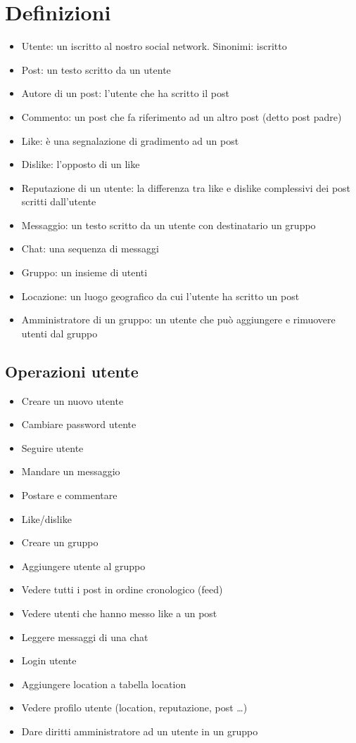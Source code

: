 \documentclass[a4paper,12pt]{report}
\begin{document}
\section{Definizioni}
\begin{itemize}
    \item Utente: un iscritto al nostro social network. Sinonimi: iscritto 
    \item Post: un testo scritto da un utente 
    \item Autore di un post: l'utente che ha scritto il post
    \item Commento: un post che fa riferimento ad un altro post (detto post padre)
    \item Like: è una segnalazione di gradimento ad un post
    \item Dislike: l'opposto di un like
    \item Reputazione di un utente: la differenza tra like e dislike complessivi dei post scritti dall'utente
    \item Messaggio: un testo scritto da un utente con destinatario un gruppo
    \item Chat: una sequenza di messaggi
    \item Gruppo: un insieme di utenti 
    \item Locazione: un luogo geografico da cui l'utente ha scritto un post
    \item Amministratore di un gruppo: un utente che può aggiungere e rimuovere utenti dal gruppo
\end{itemize}


\subsection{Operazioni utente}
\begin{itemize}
    \item Creare un nuovo utente
    \item Cambiare password utente
    \item Seguire utente
    \item Mandare un messaggio
    \item Postare e commentare
    \item Like/dislike
    \item Creare un gruppo
    \item Aggiungere utente al gruppo
    \item Vedere tutti i post in ordine cronologico (feed)
    \item Vedere utenti che hanno messo like a un post
    \item Leggere messaggi di una chat
    \item Login utente
    \item Aggiungere location a tabella location
    \item Vedere profilo utente (location, reputazione, post \ldots)
    \item Dare diritti amministratore ad un utente in un gruppo
\end{itemize}
\end{document}
